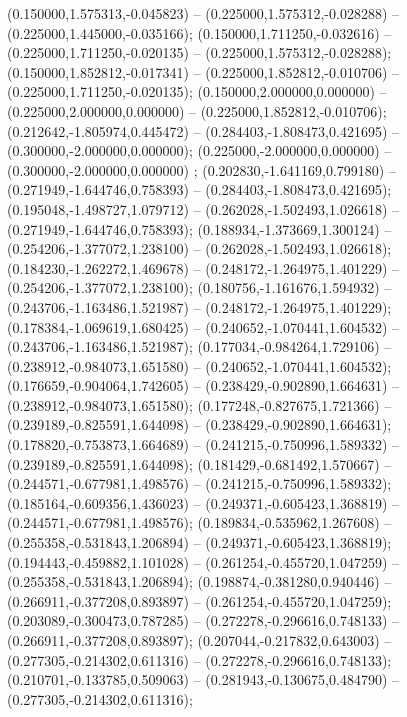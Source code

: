  (0.150000,1.575313,-0.045823) -- (0.225000,1.575312,-0.028288) -- (0.225000,1.445000,-0.035166);
 (0.150000,1.711250,-0.032616) -- (0.225000,1.711250,-0.020135) -- (0.225000,1.575312,-0.028288);
 (0.150000,1.852812,-0.017341) -- (0.225000,1.852812,-0.010706) -- (0.225000,1.711250,-0.020135);
 (0.150000,2.000000,0.000000) -- (0.225000,2.000000,0.000000) -- (0.225000,1.852812,-0.010706);
 (0.212642,-1.805974,0.445472) -- (0.284403,-1.808473,0.421695) -- (0.300000,-2.000000,0.000000);
 (0.225000,-2.000000,0.000000) -- (0.300000,-2.000000,0.000000) ;
 (0.202830,-1.641169,0.799180) -- (0.271949,-1.644746,0.758393) -- (0.284403,-1.808473,0.421695);
 (0.195048,-1.498727,1.079712) -- (0.262028,-1.502493,1.026618) -- (0.271949,-1.644746,0.758393);
 (0.188934,-1.373669,1.300124) -- (0.254206,-1.377072,1.238100) -- (0.262028,-1.502493,1.026618);
 (0.184230,-1.262272,1.469678) -- (0.248172,-1.264975,1.401229) -- (0.254206,-1.377072,1.238100);
 (0.180756,-1.161676,1.594932) -- (0.243706,-1.163486,1.521987) -- (0.248172,-1.264975,1.401229);
 (0.178384,-1.069619,1.680425) -- (0.240652,-1.070441,1.604532) -- (0.243706,-1.163486,1.521987);
 (0.177034,-0.984264,1.729106) -- (0.238912,-0.984073,1.651580) -- (0.240652,-1.070441,1.604532);
 (0.176659,-0.904064,1.742605) -- (0.238429,-0.902890,1.664631) -- (0.238912,-0.984073,1.651580);
 (0.177248,-0.827675,1.721366) -- (0.239189,-0.825591,1.644098) -- (0.238429,-0.902890,1.664631);
 (0.178820,-0.753873,1.664689) -- (0.241215,-0.750996,1.589332) -- (0.239189,-0.825591,1.644098);
 (0.181429,-0.681492,1.570667) -- (0.244571,-0.677981,1.498576) -- (0.241215,-0.750996,1.589332);
 (0.185164,-0.609356,1.436023) -- (0.249371,-0.605423,1.368819) -- (0.244571,-0.677981,1.498576);
 (0.189834,-0.535962,1.267608) -- (0.255358,-0.531843,1.206894) -- (0.249371,-0.605423,1.368819);
 (0.194443,-0.459882,1.101028) -- (0.261254,-0.455720,1.047259) -- (0.255358,-0.531843,1.206894);
 (0.198874,-0.381280,0.940446) -- (0.266911,-0.377208,0.893897) -- (0.261254,-0.455720,1.047259);
 (0.203089,-0.300473,0.787285) -- (0.272278,-0.296616,0.748133) -- (0.266911,-0.377208,0.893897);
 (0.207044,-0.217832,0.643003) -- (0.277305,-0.214302,0.611316) -- (0.272278,-0.296616,0.748133);
 (0.210701,-0.133785,0.509063) -- (0.281943,-0.130675,0.484790) -- (0.277305,-0.214302,0.611316);
